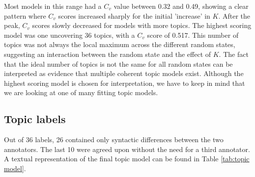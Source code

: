 \documentclass[runningheads]{llncs}
\begin{document}
Most models in this range had a $C_v$ value between 0.32 and 0.49, showing a clear pattern where $C_v$ scores increased sharply for the initial 'increase' in $K$. After the peak, $C_v$ scores slowly decreased for models with more topics. The highest scoring model was one uncovering 36 topics, with a $C_v$ score of 0.517. This number of topics was not always the local maximum across the different random states, suggesting an interaction between the random state and the effect of $K$. The fact that the ideal number of topics is not the same for all random states can be interpreted as evidence that multiple coherent topic models exist. Although the highest scoring model is chosen for interpretation, we have to keep in mind that we are looking at one of many fitting topic models. 

\subsection{Topic labels}
Out of 36 labels, 26 contained only syntactic differences between the two annotators. The last 10 were agreed upon without the need for a third annotator. A textual representation of the final topic model can be found in Table \ref{tab:topic model}. 
\end{document}
